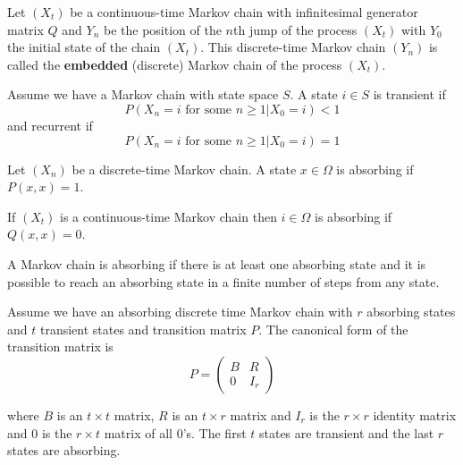 \begin{defn}
Let $(X_t)$ be a continuous-time Markov chain with infinitesimal generator matrix $Q$ and $Y_n$ be the position of the $n$th jump of the process $(X_t)$ with $Y_0$ the initial state of the chain $(X_t)$.
This discrete-time Markov chain $(Y_n)$ is called the \textbf{embedded} (discrete) Markov chain of the process $(X_t)$.
\end{defn}

\begin{defn} \cite{grimmett2001}
Assume we have a Markov chain with state space $S$.
A state $i \in S$ is transient if
$$
P(X_n = i \text{ for some } n \geq 1 | X_0 = i) < 1
$$
and recurrent if
$$
P(X_n = i \text{ for some } n \geq 1 | X_0 = i) = 1
$$
\end{defn}

\begin{defn} \cite{grinstead2003}
Let $(X_n)$ be a discrete-time Markov chain.
A state $x \in \Omega$ is absorbing if $P(x,x) = 1$.

If $(X_t)$ is a continuous-time Markov chain then $i \in \Omega$ is absorbing if $Q(x,x) = 0$.
\end{defn}

\begin{defn} \cite{grinstead2003}
A Markov chain is absorbing if there is at least one absorbing state and it is possible to reach an absorbing state in a finite number of steps from any state.
\end{defn}

\begin{defn} \cite{grinstead2003}
Assume we have an absorbing discrete time Markov chain with $r$ absorbing states and $t$ transient states and  transition matrix $P$.
The canonical form of the transition matrix is
\begin{equation}
    P = \begin{pmatrix}
        B & R\\
        0 & I_{r}
    \end{pmatrix}
\end{equation}

where $B$ is an $t \times t$ matrix, $R$ is an $t \times r$ matrix and $I_{r}$ is the $r \times r$ identity matrix and $0$ is the $r \times t$ matrix of all 0's.
The first $t$ states are transient and the last $r$ states are absorbing.
\end{defn}

